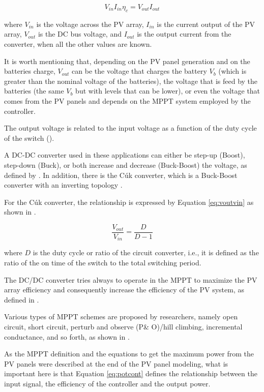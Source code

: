 \begin{equation}
\label{eq:potcont}
V_{in} I_{in} \eta_{c} = V_{out} I_{out}
\end{equation}

\noindent where $ V_{in} $ is the voltage across the PV array, $ I_{in} $ is the current output of the PV array, $ V_{out}$ is the  DC bus voltage, and $I_{out}$ is the output current from the converter, when all the other values are known.

It is worth mentioning that, depending on the PV panel generation and on the batteries charge, $ V_{out}$ can be the voltage that charges the battery $V_{b}$ (which is greater than the nominal voltage of the batteries), the voltage that is feed by the batteries (the same $V_{b}$ but with levels that can be lower), or even the voltage that comes from the PV panels and depends on the MPPT system employed by the controller.

The output voltage is related to the input voltage as a function of the duty cycle of the switch (\cite{Abdulateef}). 
 
A DC-DC converter used in these applications can either be step-up (Boost), step-down (Buck), or both increase and decrease (Buck-Boost) the voltage, as defined by \cite{Mahanta}. In addition, there is the Cúk converter, which is a Buck-Boost converter with an inverting topology \cite{Catherine}. 

For the Cúk converter, the relationship is expressed by Equation \ref{eq:voutvin} as shown in \cite{Abdulateef}.

\begin{equation}
\label{eq:voutvin}
\dfrac{V_{out}}{V_{in}} = \dfrac{D}{D-1}
\end{equation}

\noindent where $D$ is the duty cycle or ratio of the circuit converter, i.e., it is defined as the ratio of the on time of the switch to the total switching period.
 
The DC/DC converter tries always to operate in the MPPT to maximize the PV array efficiency and consequently increase the efficiency of the PV system, as defined in \cite{Yatimi}.
  
Various types of MPPT schemes are proposed by researchers, namely open circuit, short circuit, perturb and observe (P\& O)/hill climbing, incremental conductance, and so forth, as shown in  \cite{Haque}.
 
As the MPPT definition and the equations to get the maximum power from the PV panels were described at the end of the PV panel modeling, what is important here is that Equation \ref{eq:potcont} defines the relationship between the input signal, the efficiency of the controller and the output power.
 
